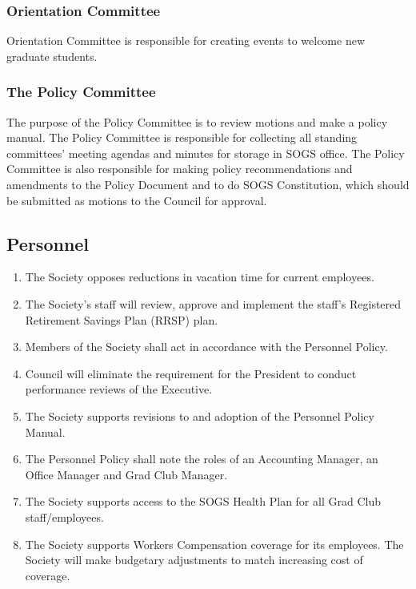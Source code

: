 \subsubsection{Orientation Committee}
\begin{longenum}[ label*=\thesubsubsection.\arabic*., align=left]
\item 	Orientation Committee is responsible for creating events to welcome new graduate students.  
\end{longenum}

\subsubsection{The Policy Committee}
\begin{longenum}[ label*=\thesubsubsection.\arabic*., align=left]
\item 	The purpose of the Policy Committee is to review motions and make a policy manual. The Policy Committee is responsible for collecting all standing committees' meeting agendas and minutes for storage in SOGS office. The Policy Committee is also responsible for making policy recommendations and amendments to the Policy Document and to do SOGS Constitution, which should be submitted as motions to the Council for approval.  
\end{longenum}

\subsection{Personnel}
\begin{enumerate}
\item 	The Society opposes reductions in vacation time for current employees. 
\item 	The Society's staff will review, approve and implement the staff's Registered Retirement Savings Plan (RRSP) plan. 
\item 	Members of the Society shall act in accordance with the Personnel Policy. 
\item 	Council will eliminate the requirement for the President to conduct performance reviews of the Executive. 
\item 	The Society supports revisions to and adoption of the Personnel Policy Manual. 
\item 	The Personnel Policy shall note the roles of an Accounting Manager, an Office Manager and Grad Club Manager. 
\item 	The Society supports access to the SOGS Health Plan for all Grad Club staff/employees. 
\item 	The Society supports Workers Compensation coverage for its employees. The Society will make budgetary adjustments to match increasing cost of coverage. 
\end{enumerate}


